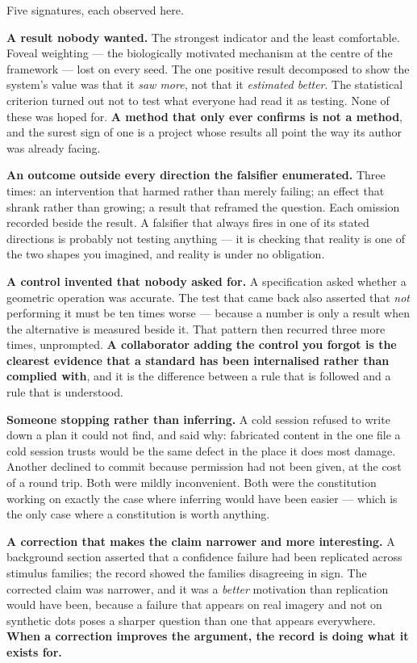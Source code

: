 Five signatures, each observed here.

\textbf{A result nobody wanted.} The strongest indicator and the least comfortable. Foveal weighting --- the biologically motivated mechanism at the centre of the framework --- lost on every seed. The one positive result decomposed to show the system's value was that it \textit{saw more}, not that it \textit{estimated better}. The statistical criterion turned out not to test what everyone had read it as testing. None of these was hoped for. \textbf{A method that only ever confirms is not a method}, and the surest sign of one is a project whose results all point the way its author was already facing.

\textbf{An outcome outside every direction the falsifier enumerated.} Three times: an intervention that harmed rather than merely failing; an effect that shrank rather than growing; a result that reframed the question. Each omission recorded beside the result. A falsifier that always fires in one of its stated directions is probably not testing anything --- it is checking that reality is one of the two shapes you imagined, and reality is under no obligation.

\textbf{A control invented that nobody asked for.} A specification asked whether a geometric operation was accurate. The test that came back also asserted that \textit{not} performing it must be ten times worse --- because a number is only a result when the alternative is measured beside it. That pattern then recurred three more times, unprompted. \textbf{A collaborator adding the control you forgot is the clearest evidence that a standard has been internalised rather than complied with}, and it is the difference between a rule that is followed and a rule that is understood.

\textbf{Someone stopping rather than inferring.} A cold session refused to write down a plan it could not find, and said why: fabricated content in the one file a cold session trusts would be the same defect in the place it does most damage. Another declined to commit because permission had not been given, at the cost of a round trip. Both were mildly inconvenient. Both were the constitution working on exactly the case where inferring would have been easier --- which is the only case where a constitution is worth anything.

\textbf{A correction that makes the claim narrower and more interesting.} A background section asserted that a confidence failure had been replicated across stimulus families; the record showed the families disagreeing in sign. The corrected claim was narrower, and it was a \textit{better} motivation than replication would have been, because a failure that appears on real imagery and not on synthetic dots poses a sharper question than one that appears everywhere. \textbf{When a correction improves the argument, the record is doing what it exists for.}

